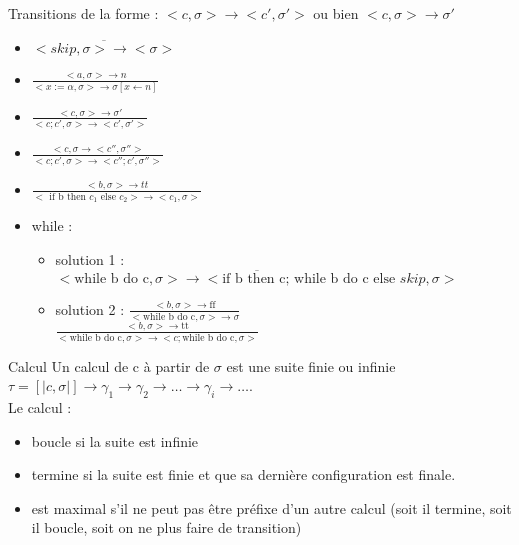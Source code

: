 \documentclass[10pt,a4paper]{article}
\newcommand{\semm}[1]{\left[| #1 | \right]}
\begin{document}
\noindent Transitions de la forme : $<c, \sigma> \rightarrow <c', \sigma'>$ ou bien $<c, \sigma> \rightarrow \sigma'$\\
\begin{itemize}


\item $\displaystyle \overline{ <skip, \sigma > \rightarrow <\sigma> }$\\
\item $\displaystyle\frac{<a, \sigma > \rightarrow n }{ < x := \alpha , \sigma > \rightarrow \sigma [x \leftarrow n ] }$\\
\item $\displaystyle \frac{ <c, \sigma > \rightarrow \sigma' }{  < c; c' , \sigma > \rightarrow <c', \sigma'> }$\\
\item $\displaystyle \frac{< c, \sigma \rightarrow <c'', \sigma''>}{ <c; c', \sigma > \rightarrow <c''; c', \sigma'' > }$\\
\item $\displaystyle \frac{ <b, \sigma> \rightarrow tt }{<\text{ if b then }  c_1\text{ else }c_2> \rightarrow <c_1, \sigma > }$\\
\item while : \begin{itemize}


 \item solution 1 : $\displaystyle \overline{ < \text{while b do c}, \sigma > \rightarrow < \text{if b then c; while b do c else }skip, \sigma > }$\\
 
\item solution 2 : $\displaystyle \frac{ < b, \sigma > \rightarrow \text{ff}}{ < \text{while b do c}, \sigma > \rightarrow \sigma }$\\

$\displaystyle  \frac{ < b, \sigma > \rightarrow \text{tt}}{ < \text{while b do c}, \sigma > \rightarrow <c;\text{while b do c}, \sigma >}$\\
\end{itemize}
\end{itemize}

\begin{definition}{Calcul} Un calcul de c à partir de $\sigma$ est une suite finie ou infinie 
$\tau = \semm{c, \sigma} \rightarrow \gamma_1 \rightarrow \gamma_2 \rightarrow \dotsc \rightarrow \gamma_i \rightarrow \dotsc$.\\
Le calcul :\begin{itemize}
\item boucle si la suite est infinie
\item termine si la suite est finie et que sa dernière configuration est finale.
\item est maximal s'il ne peut pas \^etre préfixe d'un autre calcul (soit il termine, soit il boucle, soit on ne plus faire de transition)
\end{itemize}
\end{definition}
\end{document}
